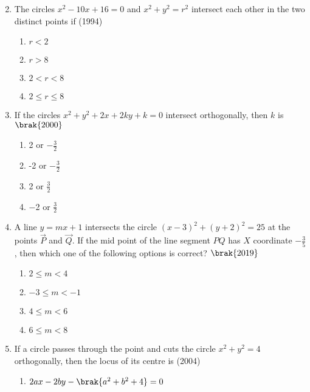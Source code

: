 \begin{enumerate}[label=\thesubsection.\arabic*.,ref=\thesubsection.\theenumi]
\begin{multicols}{4}
\end{multicols}
    \item The circles $x^{2}-10x+16=0$ and $x^{2}+y^{2}=r^{2}$ intersect each other in the two distinct points if
    \hfill {(1994)}
    \begin{multicols}{4}
\begin{enumerate}
    	\item $r<2$
    	\item $r>8$
    	\item $2<r<8$
    	\item $2\leq r\leq8$
    \end{enumerate}
\end{multicols}
     \item If the circles $x^2+y^2+2x+2ky+k=0$ intersect orthogonally, then $k$ is
        \hfill$\brak{2000}$
    \begin{multicols}{4}
\begin{enumerate}
        \item 2 or $-\frac{3}{2}$
        \item -2 or $-\frac{3}{2}$
        \item 2 or $\frac{3}{2}$
        \item $-$2 or $\frac{3}{2}$
    \end{enumerate}
    \end{multicols}
             \item A line $y=mx+1$ intersects the circle $(x-3)^2+(y+2)^2=25$ at the points $\vec{P}$ and $\vec{Q}$. If the mid point of the line segment $PQ$ has $X$ coordinate $-\frac{3}{5}$,  then which one of the following options is correct?
                 \hfill$\brak{ 2019}$
                 \begin{multicols}{4}
\begin{enumerate}
                 \item $2\le m<4$
                 \item $-3\le m<-1$
                 \item $4\le m<6$
                 \item $6\le m<8$
             \end{enumerate}
\end{multicols}
\item If a circle passes through the point  and cuts the circle $x^2+y^2=4$ orthogonally,  then the locus of its centre is
\hfill{(2004)}
\begin{multicols}{2}
\begin{enumerate}
\item $2ax-2by-\brak{a^2+b^2+4}=0$

\end{enumerate}
\end{multicols}
\end{enumerate}

